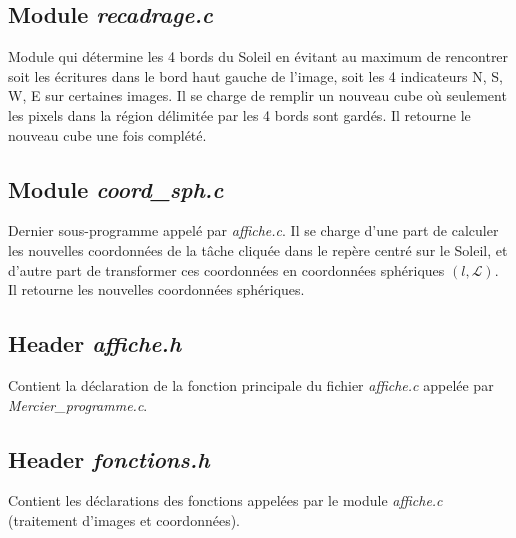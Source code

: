 \documentclass[a4paper,11pt]{article}
\numberwithin{equation}{section}
\begin{document}
\subsection{Module \textit{recadrage.c}}
Module qui détermine les 4 bords du Soleil en évitant au maximum de rencontrer soit les écritures dans le bord haut gauche de l'image, soit les 4 indicateurs N, S, W, E sur certaines images. Il se charge de remplir un nouveau cube où seulement les pixels dans la région délimitée par les 4 bords sont gardés.\newline
Il retourne le nouveau cube une fois complété.

\subsection{Module \textit{coord\_sph.c}}
Dernier sous-programme appelé par \textit{affiche.c}. Il se charge d'une part de calculer les nouvelles coordonnées de la tâche cliquée dans le repère centré sur le Soleil, et d'autre part de transformer ces coordonnées en coordonnées sphériques $(l, \mathscr{L})$.\newline
Il retourne les nouvelles coordonnées sphériques.

\subsection{Header \textit{affiche.h}}
Contient la déclaration de la fonction principale du fichier \textit{affiche.c} appelée par \textit{Mercier\_programme.c}.

\subsection{Header \textit{fonctions.h}}
Contient les déclarations des fonctions appelées par le module \textit{affiche.c} (traitement d'images et coordonnées).
\end{document}
